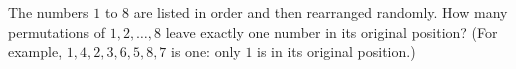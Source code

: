 The numbers $1$ to $8$ are listed in order and then rearranged randomly. How many permutations of $1,2,\dots,8$ leave exactly one number in its original position? (For example, $1,4,2,3,6,5,8,7$ is one: only $1$ is in its original position.)

